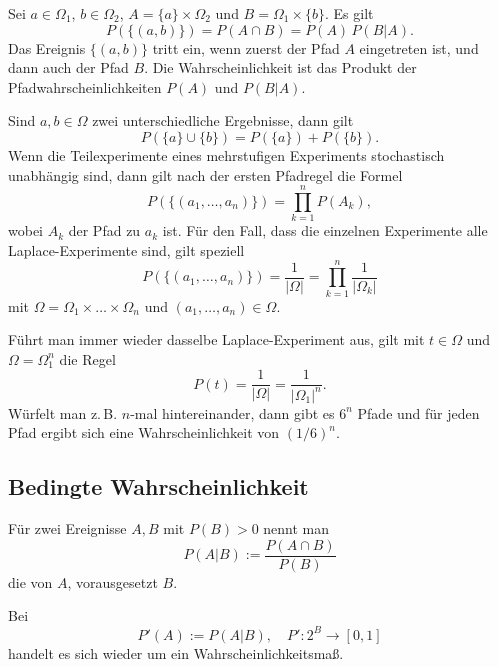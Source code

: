 Sei $a\in\Omega_1$, $b\in\Omega_2$, $A=\{a\}\times\Omega_2$
und $B=\Omega_1\times\{b\}$. Es gilt
\begin{equation}
P(\{(a,b)\}) = P(A\cap B) = P(A)\,P(B|A).
\end{equation}
Das Ereignis $\{(a,b)\}$ tritt ein, wenn zuerst
der Pfad $A$ eingetreten ist, und dann auch der Pfad $B$.
Die Wahrscheinlichkeit ist das Produkt der Pfadwahrscheinlichkeiten
$P(A)$ und $P(B|A)$.

Sind $a,b\in\Omega$ zwei unterschiedliche
Ergebnisse, dann gilt
\begin{equation}
P(\{a\}\cup\{b\}) = P(\{a\})+P(\{b\}).
\end{equation}
Wenn die Teilexperimente eines mehrstufigen Experiments
stochastisch unabhängig sind, dann gilt nach der ersten Pfadregel
die Formel
\begin{equation}
P(\{(a_1,\ldots,a_n)\}) = \prod_{k=1}^n P(A_k),
\end{equation}
wobei $A_k$ der Pfad zu $a_k$ ist.
Für den Fall, dass die einzelnen
Experimente alle Laplace-Experimente sind, gilt speziell
\begin{equation}
P(\{(a_1,\ldots,a_n)\}) = \frac{1}{|\Omega|} = \prod_{k=1}^n \frac{1}{|\Omega_k|}
\end{equation}
mit $\Omega=\Omega_1\times\ldots\times\Omega_n$ und $(a_1,\ldots,a_n)\in\Omega$.

Führt man immer wieder dasselbe Laplace-Experiment aus, gilt
mit $t\in\Omega$ und $\Omega=\Omega_1^n$ die Regel
\begin{equation}
P(t) = \frac{1}{|\Omega|} = \frac{1}{|\Omega_1|^n}.
\end{equation}
Würfelt man z.\,B. $n$-mal hintereinander, dann gibt es $6^n$ Pfade
und für jeden Pfad ergibt sich eine Wahrscheinlichkeit von $(1/6)^n$.

\subsection{Bedingte Wahrscheinlichkeit}
\begin{definition}\mbox{}\newline%
Für zwei Ereignisse $A,B$ mit $P(B)>0$ nennt man
\begin{equation}
P(A|B) := \frac{P(A\cap B)}{P(B)}
\end{equation}
die  von $A$, vorausgesetzt $B$.
\end{definition}
Bei
\begin{equation}
P'(A) := P(A|B),\quad P'\colon 2^B\to [0,1]
\end{equation}
handelt es sich wieder um ein Wahrscheinlichkeitsmaß.

